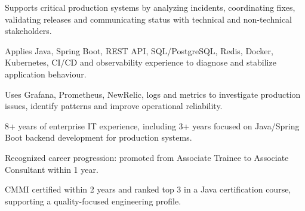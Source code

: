 \documentclass[11pt, a4paper]{awesome-cv}
\begin{document}
\makecvheader

\vspace{-0.5ex}
\noindent{}\par
\vspace{0.6ex}
\noindent{}\par
\vspace{0.6ex}
\noindent{}\par

\begin{cvitems}
  \item {Supports critical production systems by analyzing incidents, coordinating fixes, validating releases and communicating status with technical and non-technical stakeholders.}
  \item {Applies Java, Spring Boot, REST API, SQL/PostgreSQL, Redis, Docker, Kubernetes, CI/CD and observability experience to diagnose and stabilize application behaviour.}
  \item {Uses Grafana, Prometheus, NewRelic, logs and metrics to investigate production issues, identify patterns and improve operational reliability.}
  \item {8+ years of enterprise IT experience, including 3+ years focused on Java/Spring Boot backend development for production systems.}
  \item {Recognized career progression: promoted from Associate Trainee to Associate Consultant within 1 year.}
  \item {CMMI certified within 2 years and ranked top 3 in a Java certification course, supporting a quality-focused engineering profile.}
\end{cvitems}
\end{document}
